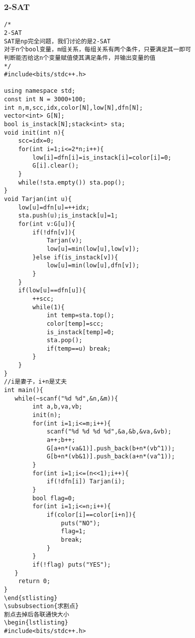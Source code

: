 \documentclass[twocolumn,a4]{article}
\begin{document}
\subsubsection{2-SAT}
\begin{lstlisting}
/*
2-SAT
SAT是np完全问题，我们讨论的是2-SAT
对于n个bool变量，m组关系，每组关系有两个条件，只要满足其一即可
判断能否给这n个变量赋值使其满足条件，并输出变量的值
*/
#include<bits/stdc++.h>

using namespace std;
const int N = 3000+100;
int n,m,scc,idx,color[N],low[N],dfn[N];
vector<int> G[N];
bool is_instack[N];stack<int> sta;
void init(int n){
    scc=idx=0;
    for(int i=1;i<=2*n;i++){
        low[i]=dfn[i]=is_instack[i]=color[i]=0;
        G[i].clear();
    }
    while(!sta.empty()) sta.pop();
}
void Tarjan(int u){
    low[u]=dfn[u]=++idx;
    sta.push(u);is_instack[u]=1;
    for(int v:G[u]){
        if(!dfn[v]){
            Tarjan(v);
            low[u]=min(low[u],low[v]);
        }else if(is_instack[v]){
            low[u]=min(low[u],dfn[v]);
        }
    }
    if(low[u]==dfn[u]){
        ++scc;
        while(1){
            int temp=sta.top();
            color[temp]=scc;
            is_instack[temp]=0;
            sta.pop();
            if(temp==u) break;
        }
    }
}
//i是妻子，i+n是丈夫
int main(){
   while(~scanf("%d %d",&n,&m)){
        int a,b,va,vb;
        init(n);
        for(int i=1;i<=m;i++){
            scanf("%d %d %d %d",&a,&b,&va,&vb);
            a++;b++;
            G[a+n*(va&1)].push_back(b+n*(vb^1));
            G[b+n*(vb&1)].push_back(a+n*(va^1));
        }
        for(int i=1;i<=(n<<1);i++){
            if(!dfn[i]) Tarjan(i);
        }
        bool flag=0;
        for(int i=1;i<=n;i++){
            if(color[i]==color[i+n]){
                puts("NO");
                flag=1;
                break;
            }
        }
        if(!flag) puts("YES");
   }
    return 0;
}
\end{stlisting}
\subsubsection{求割点}
割点去掉后各联通快大小
\begin{lstlisting}
#include<bits/stdc++.h>


\end{lstlisting}
\end{document}
